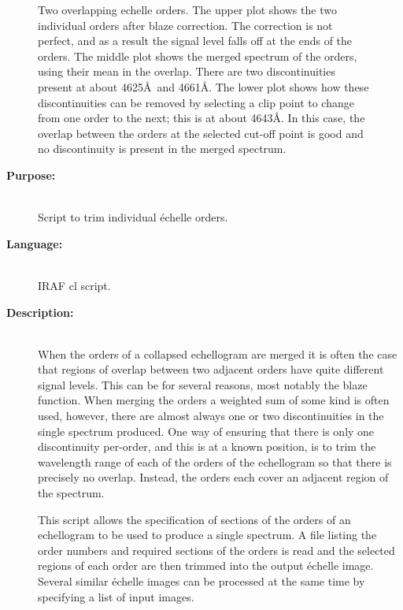 \documentclass[twoside,11pt]{article}
\renewcommand{\_}{\texttt{\symbol{95}}}
\begin{document}
\begin{figure}[h]
\begin{center}
\parbox{140mm}{
\caption{Two overlapping echelle orders.  The upper plot shows the two
individual orders after blaze correction.  The correction is not perfect,
and as a result the signal level falls off at the ends of the orders.
The middle plot shows the merged spectrum of the orders, using their mean in
the overlap.  There are two discontinuities present at about 4625\AA\ and
4661\AA .  The lower plot shows how these discontinuities can be removed by
selecting a clip point to change from one order to the next; this is at about
4643\AA .  In this case, the overlap between the orders at the selected
cut-off point is good and no discontinuity is present in the merged
spectrum.
}
}
\end{center}
\label{fi_ech_trim1}
\end{figure}

\begin{description}

\item [{\bf Purpose:}] \mbox{} \\
     Script to trim individual \'{e}chelle orders.

\item [{\bf Language:}] \mbox{} \\
     IRAF cl script.

\item [{\bf Description:}] \mbox{} \\
     When the orders of a collapsed echellogram are merged it is
     often the case that regions of overlap between two adjacent
     orders have quite different signal levels.  This can be for
     several reasons, most notably the blaze function.  When merging
     the orders a weighted sum of some kind is often used, however,
     there are almost always one or two discontinuities in the single
     spectrum produced.  One way of ensuring that there is only one
     discontinuity per-order, and this is at a known position, is
     to trim the wavelength range of each of the orders of the
     echellogram so that there is precisely no overlap.  Instead,
     the orders each cover an adjacent region of the spectrum.

     This script allows the specification of sections of the orders
     of an echellogram to be used to produce a single spectrum.
     A file listing the order numbers and required sections of the
     orders is read and the selected regions of each order are then
     trimmed into the output \'{e}chelle image.  Several similar \'{e}chelle
     images can be processed at the same time by specifying a list
     of input images.


\end{description}
\end{document}
